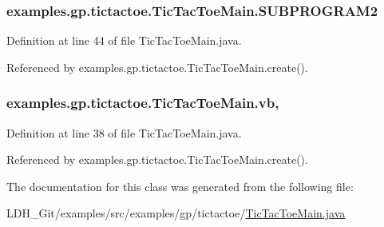 \hypertarget{classexamples_1_1gp_1_1tictactoe_1_1_tic_tac_toe_main_ab9e44b870fe88c9df50fbc4aad0015f9}{
\subsubsection[{S\-U\-B\-P\-R\-O\-G\-R\-A\-M2}]{ examples.\-gp.\-tictactoe.\-Tic\-Tac\-Toe\-Main.\-S\-U\-B\-P\-R\-O\-G\-R\-A\-M2\hspace{0.3cm}{\ttfamily [static]}}}\label{classexamples_1_1gp_1_1tictactoe_1_1_tic_tac_toe_main_ab9e44b870fe88c9df50fbc4aad0015f9}


Definition at line 44 of file Tic\-Tac\-Toe\-Main.\-java.



Referenced by examples.\-gp.\-tictactoe.\-Tic\-Tac\-Toe\-Main.\-create().

\hypertarget{classexamples_1_1gp_1_1tictactoe_1_1_tic_tac_toe_main_aa8bf4d13930cdba013b37193e08e74b2}{
\subsubsection[{vb}]{ examples.\-gp.\-tictactoe.\-Tic\-Tac\-Toe\-Main.\-vb\hspace{0.3cm}{\ttfamily [static]}, {\ttfamily [private]}}}\label{classexamples_1_1gp_1_1tictactoe_1_1_tic_tac_toe_main_aa8bf4d13930cdba013b37193e08e74b2}


Definition at line 38 of file Tic\-Tac\-Toe\-Main.\-java.



Referenced by examples.\-gp.\-tictactoe.\-Tic\-Tac\-Toe\-Main.\-create().



The documentation for this class was generated from the following file\-:\begin{DoxyCompactItemize}
\item 
L\-D\-H\-\_\-\-Git/examples/src/examples/gp/tictactoe/\hyperlink{_tic_tac_toe_main_8java}{Tic\-Tac\-Toe\-Main.\-java}\end{DoxyCompactItemize}
